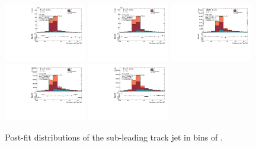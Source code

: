 \begin{figure}[htbp]
  \centering
 \includegraphics[width=0.32\textwidth]{figures/gbb/Sub_Sd0_Fits/Canv_Fit_0-Zp_T-01_LpT_INF_SpT_INF_coarse_y.pdf}
 \includegraphics[width=0.32\textwidth]{figures/gbb/Sub_Sd0_Fits/Canv_Fit_01-Zp_T-02_LpT_INF_SpT_INF_coarse_y.pdf}
 \includegraphics[width=0.32\textwidth]{figures/gbb/Sub_Sd0_Fits/Canv_Fit_02-Zp_T-03_LpT_INF_SpT_INF_coarse_y.pdf}\\
 \includegraphics[width=0.32\textwidth]{figures/gbb/Sub_Sd0_Fits/Canv_Fit_03-Zp_T-04_LpT_INF_SpT_INF_coarse_y.pdf}
 \includegraphics[width=0.32\textwidth]{figures/gbb/Sub_Sd0_Fits/Canv_Fit_04-Zp_T-05_LpT_INF_SpT_INF_coarse_y.pdf}

\caption{Post-fit \subsdzero distributions of the sub-leading track jet in bins of \zpt. }
  \label{fig:ZpT-postfits-subleading}
\end{figure}


